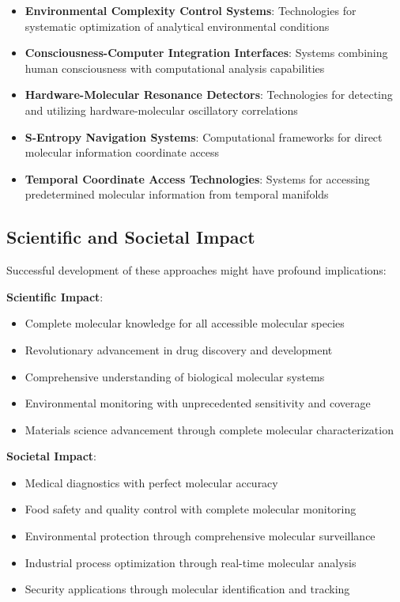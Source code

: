 \documentclass[11pt,a4paper]{article}
\theoremstyle{remark}
\begin{document}
{{{{{{{{{{\begin{itemize}
\item \textbf{Environmental Complexity Control Systems}: Technologies for systematic optimization of analytical environmental conditions
\item \textbf{Consciousness-Computer Integration Interfaces}: Systems combining human consciousness with computational analysis capabilities
\item \textbf{Hardware-Molecular Resonance Detectors}: Technologies for detecting and utilizing hardware-molecular oscillatory correlations
\item \textbf{S-Entropy Navigation Systems}: Computational frameworks for direct molecular information coordinate access
\item \textbf{Temporal Coordinate Access Technologies}: Systems for accessing predetermined molecular information from temporal manifolds
\end{itemize}

\subsection{Scientific and Societal Impact}

Successful development of these approaches might have profound implications:

\textbf{Scientific Impact}:
\begin{itemize}
\item Complete molecular knowledge for all accessible molecular species
\item Revolutionary advancement in drug discovery and development
\item Comprehensive understanding of biological molecular systems
\item Environmental monitoring with unprecedented sensitivity and coverage
\item Materials science advancement through complete molecular characterization
\end{itemize}

\textbf{Societal Impact}:
\begin{itemize}
\item Medical diagnostics with perfect molecular accuracy
\item Food safety and quality control with complete molecular monitoring
\item Environmental protection through comprehensive molecular surveillance
\item Industrial process optimization through real-time molecular analysis
\item Security applications through molecular identification and tracking
\end{itemize}

}}}}}}}}}}
\end{document}
